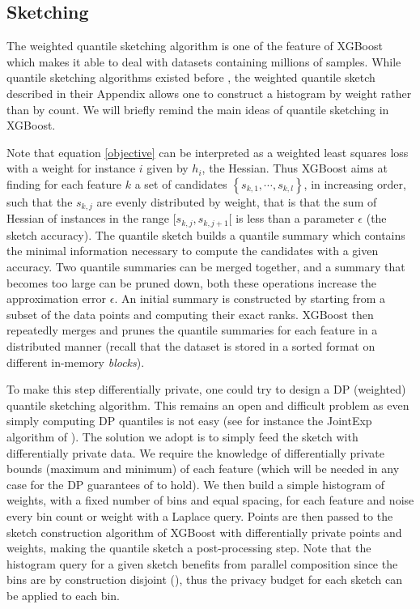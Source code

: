 \documentclass{article}
\theoremstyle{definition}
\begin{document}
\subsection{Sketching} 

The weighted quantile sketching algorithm is one of the feature of XGBoost which makes it able to deal with datasets containing millions of samples.
While quantile sketching algorithms existed before \cite{chen2016xgboost}, the weighted quantile sketch described in their Appendix allows one to construct a histogram by weight rather than by count.
We will briefly remind the main ideas of quantile sketching in XGBoost.

Note that equation \ref{objective} can be interpreted as a weighted least squares loss with a weight for instance $i$ given by $h_i$, the Hessian.
Thus XGBoost aims at finding for each feature $k$ a set of candidates $\left\{ s_{k,1}, \cdots, s_{k,l}\right\}$, in increasing order,
such that the $s_{k,j}$ are evenly distributed by weight, that is that the sum of Hessian of instances in the range $[s_{k,j}, s_{k,j+1}[$
is less than a parameter $\epsilon$ (the sketch accuracy). The quantile sketch builds a quantile summary which contains the minimal information necessary to compute the candidates with a given accuracy.
Two quantile summaries can be merged together, and a summary that becomes too large can be pruned down,
both these operations increase the approximation error $\epsilon$. An initial summary is constructed by starting from a subset of the data points and computing their exact ranks.
XGBoost then repeatedly merges and prunes the quantile summaries for each feature in a distributed manner (recall that the dataset is stored in a sorted format on different in-memory \textit{blocks}). 

To make this step differentially private, one could try to design a DP (weighted) quantile sketching algorithm.
This remains an open and difficult problem as even simply computing DP quantiles is not easy (see for instance the JointExp algorithm of \cite{gillenwater2021}).
The solution we adopt is to simply feed the sketch with differentially private data.
We require the knowledge of differentially private bounds (maximum and minimum) of each feature (which will be needed in any case for the DP guarantees of \cite{li2020privacy} to hold).
We then build a simple histogram of weights, with a fixed number of bins and equal spacing, for each feature and noise every bin count or weight with a Laplace query.
Points are then passed to the sketch construction algorithm of XGBoost with differentially private points and weights, making the quantile sketch a post-processing step.
Note that the histogram query for a given sketch benefits from parallel composition since the bins are by construction disjoint (\cite{dwork2014}), thus the privacy budget for each sketch can be applied to each bin. 
\end{document}
